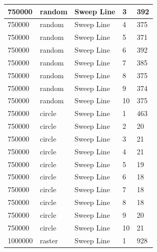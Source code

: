 \documentclass[12pt]{article}
\begin{document}
\begin{longtable}{|l|l|l|l|l|}
750000       & random            & Sweep Line & 3          & 392                           \\ \hline
750000       & random            & Sweep Line & 4          & 375                           \\ \hline
750000       & random            & Sweep Line & 5          & 371                           \\ \hline
750000       & random            & Sweep Line & 6          & 392                           \\ \hline
750000       & random            & Sweep Line & 7          & 385                           \\ \hline
750000       & random            & Sweep Line & 8          & 375                           \\ \hline
750000       & random            & Sweep Line & 9          & 374                           \\ \hline
750000       & random            & Sweep Line & 10         & 375                           \\ \hline
750000       & circle            & Sweep Line & 1          & 463                           \\ \hline
750000       & circle            & Sweep Line & 2          & 20                            \\ \hline
750000       & circle            & Sweep Line & 3          & 21                            \\ \hline
750000       & circle            & Sweep Line & 4          & 21                            \\ \hline
750000       & circle            & Sweep Line & 5          & 19                            \\ \hline
750000       & circle            & Sweep Line & 6          & 18                            \\ \hline
750000       & circle            & Sweep Line & 7          & 18                            \\ \hline
750000       & circle            & Sweep Line & 8          & 18                            \\ \hline
750000       & circle            & Sweep Line & 9          & 20                            \\ \hline
750000       & circle            & Sweep Line & 10         & 21                            \\ \hline
1000000      & raster            & Sweep Line & 1          & 928                           \\ \hline

\end{longtable}
\end{document}
